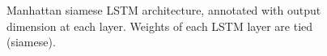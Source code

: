 \documentclass[letterpaper, 10 pt, conference]{ieeeconf}  %
\begin{document}
   \begin{figure}[thpb]
      \centering
      \caption{Manhattan siamese LSTM architecture, annotated with output dimension at each layer. Weights of each LSTM layer are tied (siamese).}
      \label{figurelabel}
   \end{figure}
\end{document}
